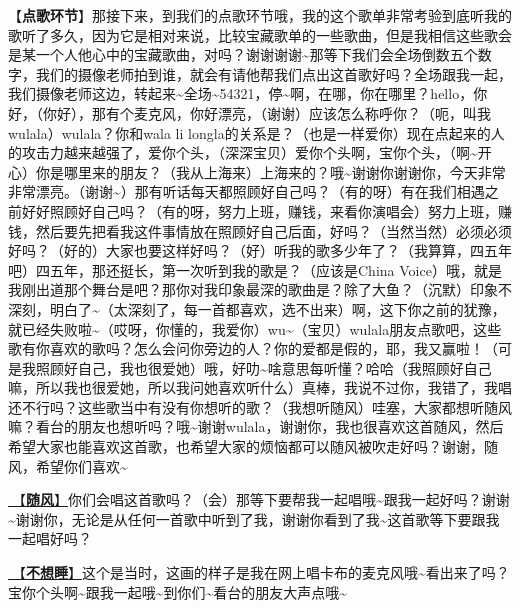 \documentclass[]{ctexbook}
\begin{document}
【\textbf{点歌环节}】那接下来，到我们的点歌环节哦，我的这个歌单非常考验到底听我的歌听了多久，因为它是相对来说，比较宝藏歌单的一些歌曲，但是我相信这些歌会是某一个人他心中的宝藏歌曲，对吗？谢谢谢谢\textasciitilde 那等下我们会全场倒数五个数字，我们的摄像老师拍到谁，就会有请他帮我们点出这首歌好吗？全场跟我一起，我们摄像老师这边，转起来\textasciitilde 全场\textasciitilde54321，停\textasciitilde 啊，在哪，你在哪里？hello，你好，（你好），那有个麦克风，你好漂亮，（谢谢）应该怎么称呼你？（呃，叫我wulala）wulala？你和wala li longla的关系是？（也是一样爱你）现在点起来的人的攻击力越来越强了，爱你个头，（深深宝贝）爱你个头啊，宝你个头，（啊\textasciitilde 开心）你是哪里来的朋友？（我从上海来）上海来的？哦\textasciitilde 谢谢你谢谢你，今天非常非常漂亮。（谢谢\textasciitilde）那有听话每天都照顾好自己吗？（有的呀）有在我们相遇之前好好照顾好自己吗？（有的呀，努力上班，赚钱，来看你演唱会）努力上班，赚钱，然后要先把看我这件事情放在照顾好自己后面，好吗？（当然当然）必须必须好吗？（好的）大家也要这样好吗？（好）听我的歌多少年了？（我算算，四五年吧）四五年，那还挺长，第一次听到我的歌是？（应该是China Voice）哦，就是我刚出道那个舞台是吧？那你对我印象最深的歌曲是？除了大鱼？（沉默）印象不深刻，明白了\textasciitilde（太深刻了，每一首都喜欢，选不出来）啊，这下你之前的犹豫，就已经失败啦\textasciitilde（哎呀，你懂的，我爱你）wu\textasciitilde（宝贝）wulala朋友点歌吧，这些歌有你喜欢的歌吗？怎么会问你旁边的人？你的爱都是假的，耶，我又赢啦！（可是我照顾好自己，我也很爱她）哦，好叻\textasciitilde 啥意思每听懂？哈哈（我照顾好自己嘛，所以我也很爱她，所以我问她喜欢听什么）真棒，我说不过你，我错了，我唱还不行吗？这些歌当中有没有你想听的歌？（我想听随风）哇塞，大家都想听随风嘛？看台的朋友也想听吗？哦\textasciitilde 谢谢wulala，谢谢你，我也很喜欢这首随风，然后希望大家也能喜欢这首歌，也希望大家的烦恼都可以随风被吹走好吗？谢谢，随风，希望你们喜欢\textasciitilde{}

\hyperref[with-wind]{🎵【\textbf{随风}】}你们会唱这首歌吗？（会）那等下要帮我一起唱哦\textasciitilde 跟我一起好吗？谢谢\textasciitilde 谢谢你，无论是从任何一首歌中听到了我，谢谢你看到了我\textasciitilde 这首歌等下要跟我一起唱好吗？

\hyperref[keep-playing]{🎵【\textbf{不想睡}】}这个是当时，这画的样子是我在网上唱卡布的麦克风哦\textasciitilde 看出来了吗？宝你个头啊\textasciitilde 跟我一起哦\textasciitilde 到你们\textasciitilde 看台的朋友大声点哦\textasciitilde{}
\end{document}
